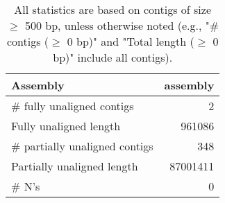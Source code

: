 \documentclass[12pt,a4paper]{article}
\begin{document}
\begin{table}[ht]
\begin{center}
\caption{All statistics are based on contigs of size $\geq$ 500 bp, unless otherwise noted (e.g., "\# contigs ($\geq$ 0 bp)" and "Total length ($\geq$ 0 bp)" include all contigs).}
\begin{tabular}{|l*{1}{|r}|}
\hline
Assembly & assembly \\ \hline
\# fully unaligned contigs & 2 \\ \hline
Fully unaligned length & 961086 \\ \hline
\# partially unaligned contigs & 348 \\ \hline
Partially unaligned length & 87001411 \\ \hline
\# N's & 0 \\ \hline
\end{tabular}
\end{center}
\end{table}
\end{document}

